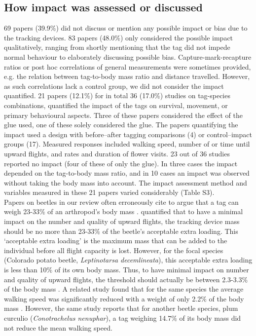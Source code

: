 \documentclass[10pt, twoside]{book} %
\begin{document}
	\subsection{How impact was assessed or discussed}
	69 papers (39.9$\%$) did not discuss or mention any possible impact or bias due to the tracking devices. 83 papers (48.0$\%$) only considered the possible impact qualitatively, ranging from shortly mentioning that the tag did not impede normal behaviour to elaborately discussing possible bias. Capture-mark-recapture ratios or post hoc correlations of general measurements were sometimes provided, e.g. the relation between tag-to-body mass ratio and distance travelled. However, as such correlations lack a control group, we did not consider the impact quantified. 21 papers (12.1$\%$) for in total 36 (17.0$\%$) studies on tag-species combinations, quantified the impact of the tags on survival, movement, or primary behavioural aspects. Three of these papers considered the effect of the glue used, one of these solely considered the glue. The papers quantifying the impact used a design with before--after tagging comparisons (4) or control--impact groups (17). Measured responses included walking speed, number of or time until upward flights, and rates and duration of flower visits. 23 out of 36 studies reported no impact (four of these of only the glue). In three cases the impact depended on the tag-to-body mass ratio, and in 10 cases an impact was observed without taking the body mass into account. The impact assessment method and variables measured in these 21 papers varied considerably (Table S3).\\
	
	Papers on beetles in our review often erroneously cite \citet{boiteau2001} to argue that a tag can weigh 23-33$\%$ of an arthropod's body mass \citep[e.g.][]{dubois2008, chiari2013}. \citet{boiteau2001} quantified that to have a minimal impact on the number and quality of upward flights, the tracking device mass should be no more than 23-33$\%$ of the beetle's acceptable extra loading. This `acceptable extra loading' is the maximum mass that can be added to the individual before all flight capacity is lost. However, for the focal species (Colorado potato beetle, \textit{Leptinotarsa decemlineata}), this acceptable extra loading is less than 10$\%$ of its own body mass. Thus, to have minimal impact on number and quality of upward flights, the threshold should actually be between 2.3-3.3$\%$ of the body mass \citep[mention 2.4$\%$]{boiteau2001}. A related study found that for the same species the average walking speed was significantly reduced with a weight of only 2.2$\%$ of the body mass \citep{boiteau2010}. However, the same study reports that for another beetle species, plum curculio (\textit{Conotrachelus nenuphar}), a tag weighing 14.7$\%$ of its body mass did not reduce the mean walking speed.\\
	
\end{document}
